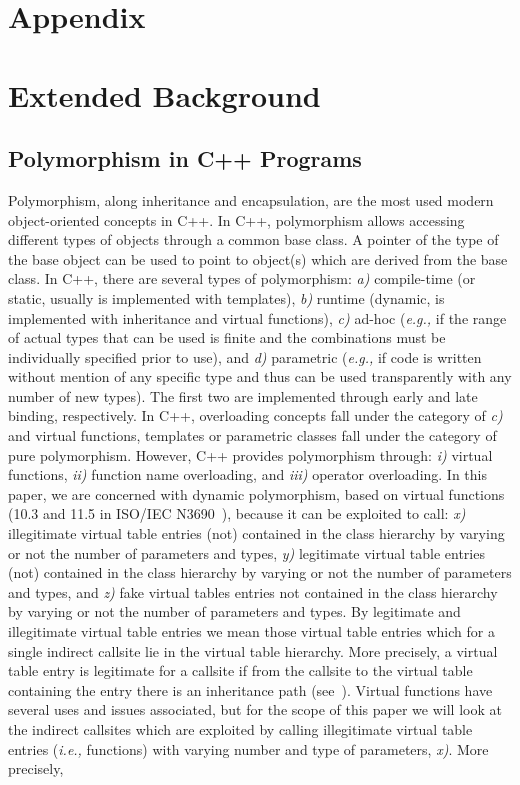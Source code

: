 \section*{Appendix}
\label{appendix}

\section{Extended Background}
\subsection{Polymorphism in C++ Programs}
\label{Polymorphism in C++}
Polymorphism, along inheritance and encapsulation, are the most used modern object-oriented concepts in C++. In C++, polymorphism allows accessing different types of objects through a common base class. A pointer of the type of the base object can be used to point to object(s) which are derived from the base class. In C++, there are several types of polymorphism:
\textit{a)} compile-time (or static, usually is implemented with templates), 
\textit{b)} runtime (dynamic, is implemented with inheritance and virtual functions), 
\textit{c)} ad-hoc (\textit{e.g.,} if the range of actual types that can be used is finite and the combinations must be individually specified prior to use), and
\textit{d)} parametric (\textit{e.g.,} if code is written without mention of any specific type and thus can be used transparently with any number of new types). 
The first two are implemented through early and late binding, respectively. In C++, overloading concepts fall under the category of \textit{c)} and virtual functions, templates or parametric classes fall under the category of pure polymorphism. However, C++ provides polymorphism through: 
\textit{i)} virtual functions,
\textit{ii)} function name overloading, and 
\textit{iii)} operator overloading. 
In this paper, we are concerned with dynamic polymorphism, based on virtual functions (10.3 and 11.5 in ISO/IEC N3690~\cite{iso:iecN3690}), because it can be exploited to call: 
\textit{x)} illegitimate virtual table entries (not) contained in the class hierarchy by varying or not the number of parameters and types,
\textit{y)} legitimate virtual table entries (not) contained in the class hierarchy by varying or not the number of parameters and types, and 
\textit{z)} fake virtual tables entries not contained in the class hierarchy by varying or not the number of parameters and types.
By legitimate and illegitimate virtual table entries we mean those virtual table entries which for a single indirect callsite lie in the virtual table hierarchy. More precisely, a virtual table entry is legitimate for a callsite if from the callsite to the virtual table containing the entry there is an inheritance path (see~\cite{haller:shrinkwrap}). Virtual functions have several uses and issues associated, but for the scope of this paper we will look at the indirect callsites which are exploited by calling illegitimate virtual table entries (\textit{i.e.,} functions) with varying number and type of parameters, \textit{x)}. More precisely, 
